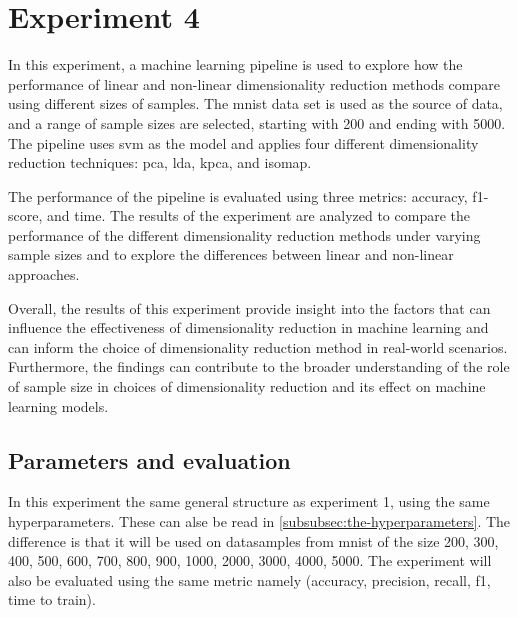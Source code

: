 \section{Experiment 4}\label{sec:experiment-4}

In this experiment, a machine learning pipeline is used to explore how the performance of linear and non-linear dimensionality reduction methods compare using different sizes of samples. The \gls{mnist} data set is used as the source of data, and a range of sample sizes are selected, starting with 200 and ending with 5000. The pipeline uses \gls{svm} as the model and applies four different dimensionality reduction techniques: \gls{pca}, \gls{lda}, \gls{kpca}, and \gls{isomap}.

The performance of the pipeline is evaluated using three metrics: accuracy, f1-score, and time. The results of the experiment are analyzed to compare the performance of the different dimensionality reduction methods under varying sample sizes and to explore the differences between linear and non-linear approaches.

Overall, the results of this experiment provide insight into the factors that can influence the effectiveness of dimensionality reduction in machine learning and can inform the choice of dimensionality reduction method in real-world scenarios. Furthermore, the findings can contribute to the broader understanding of the role of sample size in choices of dimensionality reduction and its effect on machine learning models.

\subsection{Parameters and evaluation}
In this experiment the same general structure as experiment 1, using the same hyperparameters. These can alse be read in \ref{subsubsec:the-hyperparameters}. The difference is that it will be used on datasamples from \gls{mnist} of the size 200, 300, 400, 500, 600, 700, 800, 900, 1000, 2000, 3000, 4000, 5000. The experiment will also be evaluated using the same metric namely (accuracy, precision, recall, f1, time to train).





